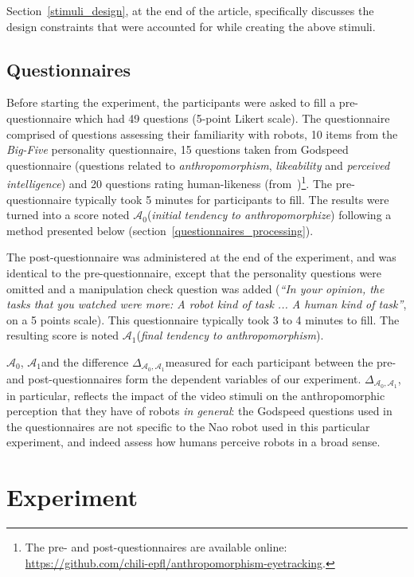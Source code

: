 \documentclass[lettersize, noapacite, twoside, HRI]{apa_HRI}
\newcommand{\anti}{{$\mathcal{A}_0$\xspace}}
\newcommand{\antf}{{$\mathcal{A}_1$\xspace}}
\newcommand{\deltaant}{{ $\Delta_{\mathcal{A}_0,\mathcal{A}_1}$\xspace}}
\begin{document}
Section~\ref{stimuli_design}, at the end of the article, specifically discusses
the design constraints that were accounted for while creating the above stimuli.

\subsection{Questionnaires}

Before starting the experiment, the participants were asked to fill a
pre-questionnaire which had 49 questions (5-point Likert scale). The
questionnaire comprised of questions assessing their familiarity with robots, 10
items from the \emph{Big-Five} personality questionnaire, 15 questions taken from
Godspeed questionnaire (questions related to \emph{anthropomorphism},
\emph{likeability} and \emph{perceived intelligence}) and 20 questions rating
human-likeness (from~\cite{ruijten_introducing_2014})\footnote{The
pre- and post-questionnaires are available online:
\url{https://github.com/chili-epfl/anthropomorphism-eyetracking}.}. The pre-questionnaire
typically took 5 minutes for participants to fill. The results were turned into
a score noted \anti (\emph{initial tendency to anthropomorphize}) following a
method presented below (section~\ref{questionnaires_processing}).

The post-questionnaire was administered at the end of the experiment, and was
identical to the pre-questionnaire, except that the personality questions were omitted and a
manipulation check question was added (\emph{``In your opinion, the tasks that
you watched were more: A robot kind of task ... A human kind of task''}, on a 5
points scale).
This questionnaire typically took 3 to 4 minutes to fill. The resulting score is
noted \antf (\emph{final tendency to anthropomorphism}).

\anti, \antf and the difference \deltaant measured for each participant between
the pre- and post-questionnaires form the dependent variables of our experiment.
\deltaant, in particular, reflects the impact of the video stimuli on the
anthropomorphic perception that they have of robots \emph{in general}: the
Godspeed questions used in the questionnaires are not specific to the Nao robot
used in this particular experiment, and indeed assess how humans perceive robots
in a broad sense.

\section{Experiment}
\end{document}
